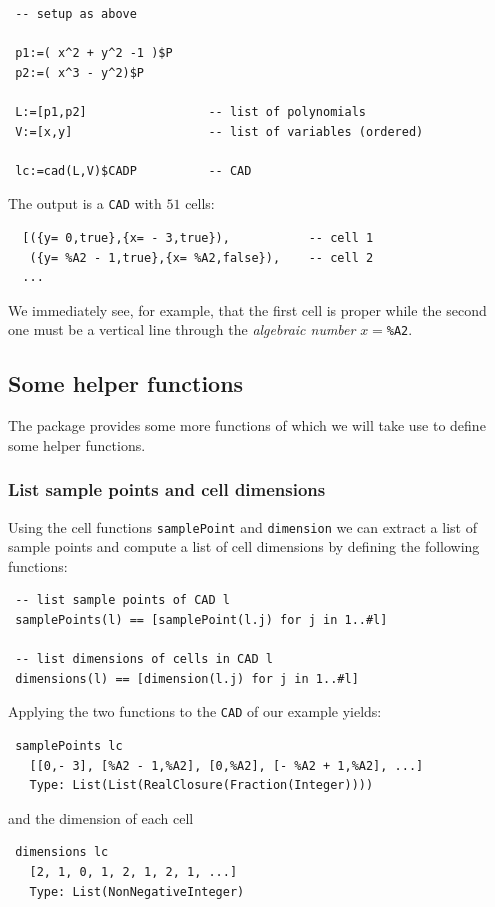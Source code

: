 \documentclass[12pt,a4paper]{article}
\newcommand{\CAD}{{\tt CAD}}
\begin{document}
% 
\begin{lstlisting}
 -- setup as above
 
 p1:=( x^2 + y^2 -1 )$P
 p2:=( x^3 - y^2)$P

 L:=[p1,p2]                 -- list of polynomials
 V:=[x,y]                   -- list of variables (ordered)

 lc:=cad(L,V)$CADP          -- CAD

\end{lstlisting}
%
The output is a {\CAD} with $51$ cells:
%
\begin{verbatim}
  [({y= 0,true},{x= - 3,true}),           -- cell 1 
   ({y= %A2 - 1,true},{x= %A2,false}),    -- cell 2
  ...                                         
\end{verbatim}
%
We immediately see, for example, that the first cell is proper while the
second one must be a vertical line through the {\em algebraic number}
$x=${\tt \%A2}.

\subsection{Some helper functions}
The package provides some more functions of which we will take use to
define some helper functions. 

\subsubsection{List sample points and cell dimensions}
Using the cell functions {\tt samplePoint} and {\tt dimension} we can 
extract a list of sample points and compute a list of cell dimensions by
defining the following functions: 
%
\begin{lstlisting}
 -- list sample points of CAD l
 samplePoints(l) == [samplePoint(l.j) for j in 1..#l]

 -- list dimensions of cells in CAD l
 dimensions(l) == [dimension(l.j) for j in 1..#l]
\end{lstlisting}
%
Applying the two functions to the {\CAD} of our example yields:
%
\begin{verbatim}
 samplePoints lc
   [[0,- 3], [%A2 - 1,%A2], [0,%A2], [- %A2 + 1,%A2], ...] 
   Type: List(List(RealClosure(Fraction(Integer)))) 
\end{verbatim}
and the dimension of each cell 
\begin{verbatim}
 dimensions lc
   [2, 1, 0, 1, 2, 1, 2, 1, ...]  
   Type: List(NonNegativeInteger)
\end{verbatim}
%
\end{document}
